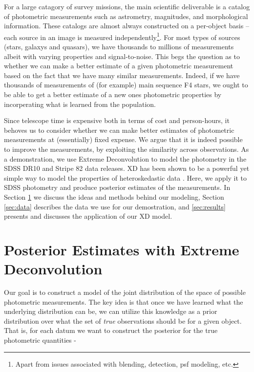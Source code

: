 \documentclass[12pt,preprint]{aastex}
\begin{document}
For a large catagory of survey missions, the main scientific deliverable is a
catalog of photometric measurements such as astrometry, magnitudes, and
morphological information.  These catalogs are almost always constructed on a 
per-object basis -- each source in an image is measured 
independently\footnote{Apart from issues associated with blending, detection,
psf modeling, etc.}.
For most types of sources (stars, galaxys and quasars), we have thousands to
millions of measurements albeit with varying properties and signal-to-noise.
This begs the question as to whether we can make a better estimate of a given
photometric measurement based on the fact that we have many similar
measurements.  Indeed, if we have thousands of measurements of (for example)
main sequence F4 stars, we ought to be able to get a better estimate of a new 
ones photometric properties by incorperating what is learned from the
population. 

Since telescope time is expensive both in terms of cost and person-hours, it
behoves us to consider whether we can make better estimates of photometric 
measurements at (essentially) fixed expense.  We argue that it is indeed
possible to improve the measurements, by exploiting the similarity across
observations.  As a demonstration, we use Extreme Deconvolution
\citep[XD, ][]{bovy09} to model the photometry in the SDSS DR10 \citep{} and
Stripe 82 \citep{} data releases.  XD has been shown to be a powerful yet
simple way to model the properties of heteroskedastic data \citep{bovy10}.
Here, we apply it to SDSS photometry and produce posterior estimates of the 
measurements.  In Section \ref{sec:method} we discuss the ideas and methods 
behind our modeling, Section \ref{sec:data} describes the data we use for 
our demostration, and \ref{sec:results} presents and discusses the application
of our XD model.

%
%
\section{Posterior Estimates with Extreme Deconvolution}
\label{sec:method}

Our goal is to construct a model of the joint distribution of the space of
possible photometric measurements.  The key idea is that once we have learned
what the underlying distribution can be, we can utilize this knowledge as a
prior distribution over what the set of \emph{true} observations should be for
a given object.  That is, for each datum we want to construct the posterior
for the true photometric quantities -
\end{document}
